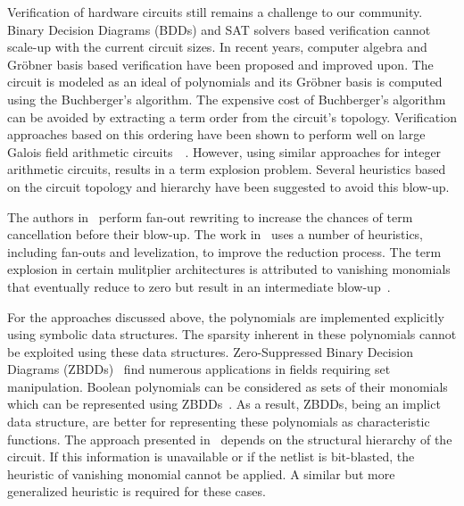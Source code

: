 \documentclass{article}
\date{}
\begin{document}
   
Verification of hardware circuits still remains a challenge to our community. Binary Decision Diagrams (BDDs) and SAT solvers based verification cannot scale-up with the current circuit sizes. In recent years, computer algebra and Gr\"obner basis based verification have been proposed and improved upon. The circuit is modeled as an ideal of polynomials and its Gr\"obner basis is computed using the Buchberger's algorithm. The expensive cost of Buchberger's algorithm can be avoided by extracting a term order from the circuit's topology. Verification approaches based on this ordering have been shown to perform well on large Galois field arithmetic circuits~\cite{lv}~\cite{tim}. However, using similar approaches for integer arithmetic circuits, results in a term explosion problem. Several heuristics based on the circuit topology and hierarchy have been suggested to avoid this blow-up.
\par
 The authors in~\cite{farahmandi:2015} perform fan-out rewriting to increase the chances of term cancellation before their blow-up. The work in~\cite{maciej:2015} uses a number of heuristics, including fan-outs and levelization, to improve the reduction process. The term explosion in certain mulitplier architectures is attributed to vanishing monomials that eventually reduce to zero but result in an intermediate blow-up~\cite{rolf:2016}.
\par
For the approaches discussed above, the polynomials are implemented explicitly using symbolic data structures. The sparsity inherent in these polynomials cannot be exploited using these data structures. Zero-Suppressed Binary Decision Diagrams (ZBDDs)~\cite{minato:zbdd} find numerous applications in fields requiring set manipulation. Boolean polynomials can be considered as sets of their monomials which can be represented using ZBDDs~\cite{polybori}. As a result, ZBDDs, being an implict data structure, are better for representing these polynomials as characteristic functions. The approach presented in~\cite{rolf:2016} depends on the structural hierarchy of the circuit. If this information is unavailable or if the netlist is bit-blasted, the heuristic of vanishing monomial cannot be applied. A similar but more generalized heuristic is required for these cases.
\par 
\end{document}
